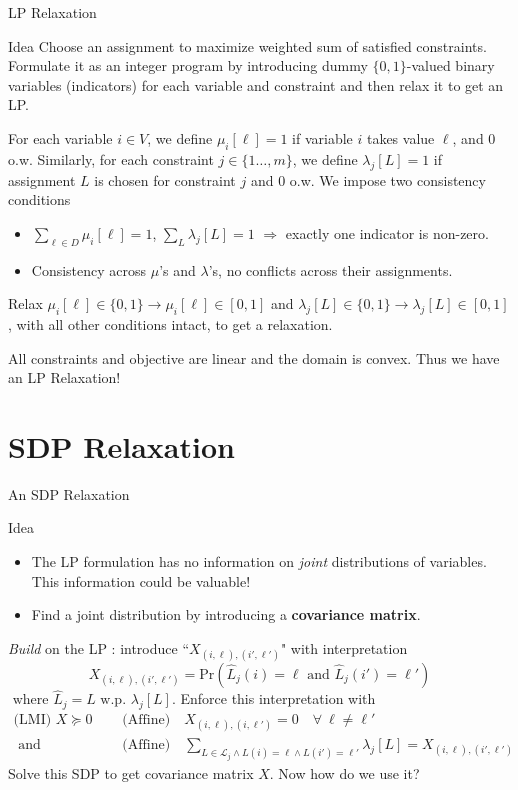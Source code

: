 \documentclass[10pt,t,compress]{beamer}
\begin{document}
\begin{frame}{LP Relaxation}
\begin{block}{Idea}
Choose an assignment to maximize weighted sum of satisfied constraints. Formulate it as an integer program by introducing dummy $\{ 0, 1\}$-valued binary variables (indicators) for each variable and constraint and then relax it to get an LP.
\end{block}
 For each variable $i \in V$, we define $\mu_i[\ell] =1$ if variable $i$ takes value $\ell$, and $0$ o.w. Similarly, for each constraint $j \in \{1\ldots, m\}$, we define $\lambda_j[L] = 1$ if assignment $L$ is chosen for constraint $j$ and $0$ o.w. We impose two consistency conditions 
 \begin{itemize}
 \item $\sum_{\ell \in D} \mu_i[\ell] = 1$, $\sum_{L} \lambda_j[L] = 1$ $\Rightarrow$ exactly one indicator is non-zero.
 \item Consistency across $\mu$'s and $\lambda$'s, no conflicts across their assignments.
 \end{itemize}
 Relax $\mu_i[\ell] \in \{ 0, 1\} \rightarrow \mu_i[\ell] \in [0, 1]$ and $\lambda_j[L] \in \{ 0, 1\} \rightarrow \lambda_j[L] \in [0, 1]$, with all other conditions intact, to get a relaxation. 
 
 All constraints and objective are linear and the domain is convex. Thus we have an LP Relaxation!
 
\end{frame}

\section{SDP Relaxation}


\begin{frame}{An SDP Relaxation}
\begin{block}{Idea}
\begin{itemize}
\item The LP formulation has no information on \textit{joint} distributions of variables. This information could be valuable!
\item Find a joint distribution by introducing a \textbf{covariance matrix}.
\end{itemize}
\end{block}
\textit{Build} on the LP : introduce  ``$X_{(i,\ell),(i',\ell')}$" with interpretation
$$X_{(i,\ell),(i',\ell')} = \text{Pr}\left( \hat{L}_j(i) = \ell \text{ and } \hat{L}_j(i') = \ell'\right)
 $$
$ \text{ where } \hat{L}_j = L  \text{ w.p. } \lambda_j\left[L\right]$. Enforce this interpretation with
\begin{align*}
 \text{(LMI) } X \succeq 0  \quad & \text{ (Affine)} \quad X_{(i,\ell),(i,\ell')} = 0  \quad  \forall ~  \ell \neq \ell' \\
 \text{ and } &\text{ (Affine)} \quad \textstyle{\sum_{L \in \mathcal{L}_j \wedge L(i) = \ell \wedge L(i') = \ell'}} \lambda_j\left[L\right] = X_{(i,\ell),(i',\ell')}
\end{align*}
Solve this SDP to get covariance matrix $X$. Now how do we use it?
\end{frame}
\end{document}

